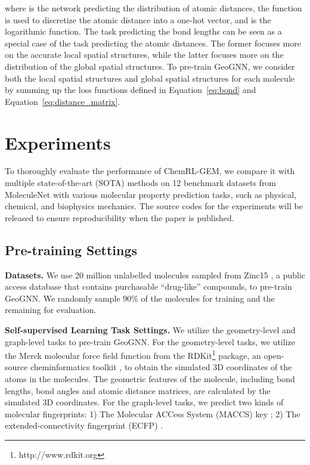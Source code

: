 \documentclass{article}
\begin{document}
where  is the network predicting the distribution of atomic distances, the  function is used to discretize the atomic distance  into a one-hot vector, and  is the logarithmic function. The task predicting the bond lengths can be seen as a special case of the task predicting the atomic distances. The former focuses more on the accurate local spatial structures, while the latter focuses more on the distribution of the global spatial structures. To pre-train GeoGNN, we consider both the local spatial structures and global spatial structures for each molecule by summing up the loss functions defined in Equation~\ref{eq:bond} and Equation~\ref{eq:distance_matrix}.




\section{Experiments}
To thoroughly evaluate the performance of ChemRL-GEM, we compare it with multiple state-of-the-art (SOTA) methods on 12 benchmark datasets from MoleculeNet \cite{DBLP:journals/corr/WuRFGGPLP17} with various molecular property prediction tasks, such as physical, chemical, and biophysics mechanics. The source codes for the experiments will be released to ensure reproducibility when the paper is published.

\subsection{Pre-training Settings}
\textbf{Datasets.}
We use 20 million unlabelled molecules sampled from Zinc15 \cite{DBLP:journals/jcisd/SterlingI15}, a public access database that contains purchasable “drug-like” compounds, to pre-train GeoGNN. We randomly sample 90\% of the molecules for training and the remaining for evaluation.

\textbf{Self-supervised Learning Task Settings.}
We utilize the geometry-level and graph-level tasks to pre-train GeoGNN. For the geometry-level tasks, we utilize the Merck molecular force field \cite{DBLP:journals/jcc/Halgren96} function from the RDKit\footnote{http://www.rdkit.org} package, an open-source cheminformatics toolkit \cite{landrum2006rdkit}, to obtain the simulated 3D coordinates of the atoms in the molecules. The geometric features of the molecule, including bond lengths, bond angles and atomic distance matrices, are calculated by the simulated 3D coordinates.
For the graph-level tasks, we predict two kinds of molecular fingerprints:
1) The Molecular ACCess System (MACCS) key \cite{DBLP:journals/jcisd/DurantLHN02}; 2) The extended-connectivity fingerprint (ECFP) \cite{DBLP:journals/jcisd/RogersH10}.
\end{document}
